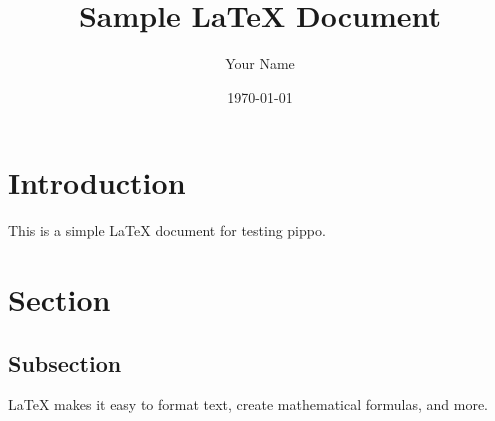 \documentclass{article}
\begin{document}
\title{Sample LaTeX Document}
\author{Your Name}
\date{\today}

\maketitle

\section{Introduction}

This is a simple LaTeX document for testing pippo.

\section{Section}

\subsection{Subsection}

\LaTeX{} makes it easy to format text, create mathematical formulas, and more.
\end{document}
